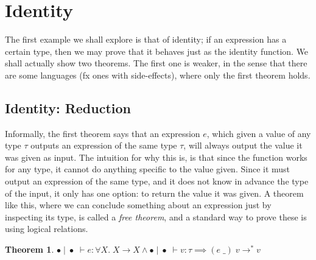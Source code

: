 \documentclass[a4paper, 11pt]{report}
\newtheorem{theorem}{Theorem}
\theoremstyle{definition}
\newcommand{\expr}{e}
\newcommand{\val}{v}
\newcommand{\Tvar}{X}
\newcommand{\Tapp}[1]{#1\;\_}
\newcommand{\Tfunc}[2]{#1 \rightarrow #2}
\newcommand{\Tall}[2]{\forall #1.\; #2}
\newcommand{\typ}{\tau}
\newcommand{\emptenv}{\bullet}
\newcommand{\empvenv}{\bullet}
\newcommand{\jdg}[4]{#1 \; | \; #2 \; \vdash #3 : #4}
\newcommand{\stepS}{\rightarrow^*}
\begin{document}
\section{Identity}
The first example we shall explore is that of identity; if an expression has a certain type, then we may prove that it behaves just as the identity function.
We shall actually show two theorems. The first one is weaker, in the sense that there are some languages (fx ones with side-effects), where only the first theorem holds.

\subsection{Identity: Reduction}
Informally, the first theorem says that an expression $\expr$, which given a value of any type $\typ$ outputs an expression of the same type $\typ$, will always output the value it was given as input. The intuition for why this is, is that since the function works for any type, it cannot do anything specific to the value given. Since it must output an expression of the same type, and it does not know in advance the type of the input, it only has one option: to return the value it was given. A theorem like this, where we can conclude something about an expression just by inspecting its type, is called a \textit{free theorem}\cite{DBLP:conf/fpca/Wadler89}, and a standard way to prove these is using logical relations.
\begin{theorem}\label{thm:identity_reduction}
  $\jdg{\emptenv}{\empvenv}{\expr}{\Tall{\Tvar}{\Tfunc{\Tvar}{\Tvar}}} \land
  \jdg{\emptenv}{\empvenv}{\val}{\typ} \implies 
  (\Tapp{\expr}) \; \val \stepS \val$
\end{theorem}
\end{document}
